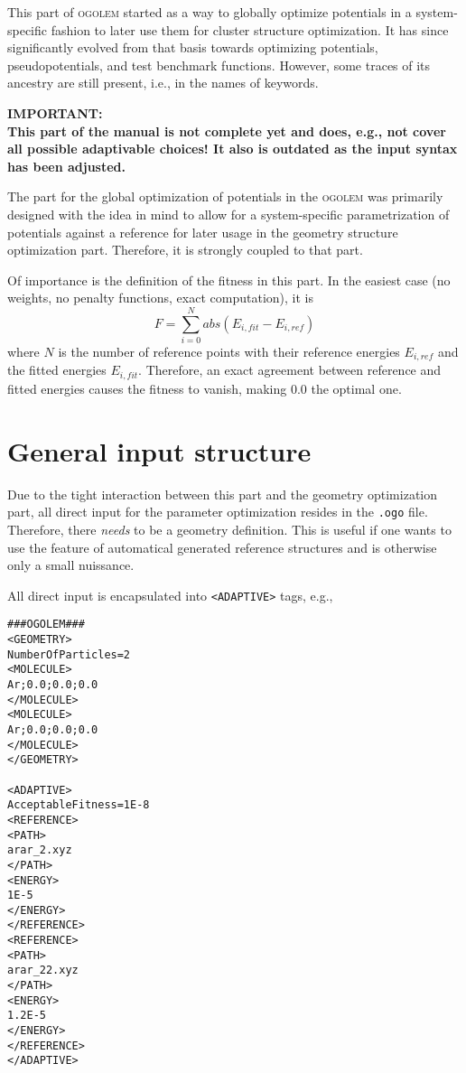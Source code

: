 \documentclass[a4paper,10pt]{scrbook}
\newcommand{\ogo}{\textsc{ogolem}}
\begin{document}
This part of \ogo{} started as a way to globally optimize potentials in
a system-specific fashion to later use them for cluster structure optimization.
It has since significantly evolved from that basis towards optimizing
potentials, pseudopotentials, and test benchmark functions. However, some traces
of its ancestry are still present, i.e., in the names of keywords.

\textbf{IMPORTANT:\\
This part of the manual is not complete yet and does, e.g., not cover all
possible adaptivable choices! It also is outdated as the input syntax has been 
adjusted.}

The part for the global optimization of potentials in the \ogo{} was primarily
designed with the idea in mind to allow for a system-specific parametrization of
potentials against a reference for later usage in the geometry structure
optimization part. Therefore, it is strongly coupled to that part.

Of importance is the definition of the fitness in this part. In the easiest case
(no weights, no penalty functions, exact computation), it is
\begin{equation}
F=\sum_{i=0}^{N}abs\left( E_{i,fit}-E_{i,ref} \right)
\end{equation}
where $N$ is the number of reference points with their reference energies
$E_{i,ref}$ and the fitted energies $E_{i,fit}$. Therefore, an exact agreement
between reference and fitted energies causes the fitness to vanish, making 0.0
the optimal one.

\label{parameterfit}
\section{General input structure}
Due to the tight interaction between this part and the geometry optimization
part, all direct input for the parameter optimization resides in the
\texttt{.ogo} file. Therefore, there \emph{needs} to be a geometry definition.
This is useful if one wants to use the feature of automatical generated
reference structures and is otherwise only a small nuissance.

All direct input is encapsulated into \texttt{<ADAPTIVE>} tags, e.g.,
\begin{verbatim}
###OGOLEM###
<GEOMETRY>
NumberOfParticles=2
<MOLECULE>
Ar;0.0;0.0;0.0
</MOLECULE>
<MOLECULE>
Ar;0.0;0.0;0.0
</MOLECULE>
</GEOMETRY>

<ADAPTIVE>
AcceptableFitness=1E-8
<REFERENCE>
<PATH>
arar_2.xyz
</PATH>
<ENERGY>
1E-5
</ENERGY>
</REFERENCE>
<REFERENCE>
<PATH>
arar_22.xyz
</PATH>
<ENERGY>
1.2E-5
</ENERGY>
</REFERENCE>
</ADAPTIVE>
\end{verbatim}
\end{document}
